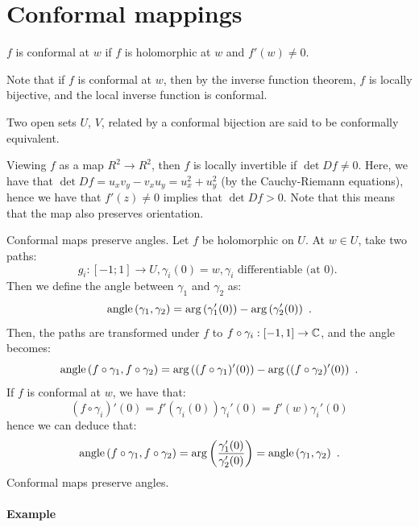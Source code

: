\section{Conformal mappings}

\begin{definition}
  $f$ is conformal at $w$ if $f$ is holomorphic at $w$ and $f'(w) \neq 0$.
\end{definition}

Note that if $f$ is conformal at $w$, then by the inverse function theorem, $f$ is locally bijective, and the local inverse function is conformal.

Two open sets $U$, $V$, related by a conformal bijection are said to be conformally equivalent.

Viewing $f$ as a map $R^2 \rightarrow R^2$, then $f$ is locally invertible if $\det Df \neq 0$. Here, we have that $\det Df = u_xv_y - v_xu_y = u_x^2 + u_y^2$ (by the Cauchy-Riemann equations), hence we have that $f'(z) \neq 0$ implies that $\det Df > 0$. Note that this means that the map also preserves orientation.

Conformal maps preserve angles. Let $f$ be holomorphic on $U$. At $w \in U$, take two paths:
\[
g_i : [-1 ; 1] \rightarrow U, \gamma_i(0) = w, \gamma_i \text { differentiable (at 0). }
\]
Then we define the angle between $\gamma_1$ and $\gamma_2$ as:
\[
\text{angle}\left(\gamma_1, \gamma_2\right) = \arg \left(\gamma_1'(0)\right) - \arg \left(\gamma_2'(0)\right) \ \text{.}
\]
Then, the paths are transformed under $f$ to $f \circ \gamma_i : [-1, 1] \rightarrow \mathbb{C}$, and the angle becomes:
\[
\text{angle}\left(f \circ \gamma_1, f \circ \gamma_2\right) = \arg \left( (f \circ \gamma_1)'(0)\right) - \arg \left( (f \circ \gamma_2)'(0)\right) \ \text{.}
\]
If $f$ is conformal at $w$, we have that:
\[
(f \circ \gamma_i)'(0) = f'\left(\gamma_i(0)\right)\gamma_i'(0) = f'(w)\gamma_i'(0)
\]
hence we can deduce that:
\[
\text{angle}\left(f \circ \gamma_1, f \circ \gamma_2\right) = \arg\left(\frac{\gamma_1'(0)}{\gamma_2'(0)}\right) = \text{angle}\left(\gamma_1, \gamma_2\right) \ \text{.}
\]
Conformal maps preserve angles.

\paragraph{Example}

